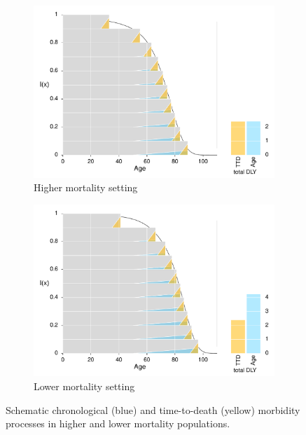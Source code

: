 \documentclass[11pt,oneside,a4paper]{article} %
\begin{document}
\begin{figure}
\centering
\begin{subfigure}{.5\textwidth}
  \centering
  \includegraphics[width=.48\linewidth]{Figures/Japan1970}
  \caption{Higher mortality setting}
  \label{fig:toypop1}
\end{subfigure}%
\begin{subfigure}{.5\textwidth}
  \centering
  \includegraphics[width=.48\linewidth]{Figures/Japan2010}
  \caption{Lower mortality setting}
  \label{fig:toypop2}
\end{subfigure}
\caption{Schematic chronological (blue) and time-to-death (yellow) morbidity
processes in higher and lower mortality populations.}
\label{fig:test}
\end{figure}
%
\end{document}
